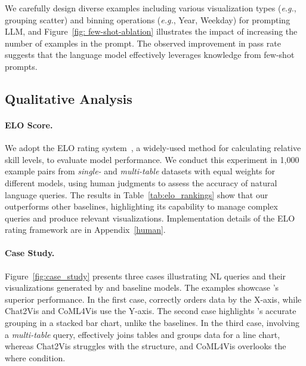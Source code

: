 We carefully design diverse examples including various visualization types (\emph{e.g.}, grouping scatter) and binning operations (\emph{e.g.}, Year, Weekday) for prompting LLM, and Figure~\ref{fig: few-shot-ablation} illustrates the impact of increasing the number of examples in the prompt. The observed improvement in pass rate suggests that the language model effectively leverages knowledge from few-shot prompts.



\subsection{Qualitative Analysis}

\paragraph{ELO Score.}
We adopt the ELO rating system~\cite{elo1978rating}, a widely-used method for calculating relative skill levels, to evaluate model performance.
We conduct this experiment in 1,000 example pairs from \textit{single-} and \textit{multi-table} datasets with equal weights for different models, using human judgments to assess the accuracy of natural language queries. The results in Table~\ref{tab:elo_rankings} show that our \system outperforms other baselines, highlighting its capability to manage complex queries and produce relevant visualizations. Implementation details of the ELO rating framework are in Appendix~\ref{human}.

\paragraph{Case Study.}
Figure~\ref{fig:case_study} presents three cases illustrating NL queries and their visualizations generated by \system and baseline models. The examples showcase \system's superior performance. In the first case, \system correctly orders data by the X-axis, while Chat2Vis and CoML4Vis use the Y-axis. The second case highlights \system's accurate grouping in a stacked bar chart, unlike the baselines. In the third case, involving a \textit{multi-table} query, \system effectively joins tables and groups data for a line chart, whereas Chat2Vis struggles with the structure, and CoML4Vis overlooks the where condition.

